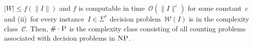 \documentclass{article}
\newcommand{\bigO}[1]{\ensuremath{{\mathcal O}(#1)}}
\newcommand{\CCard}[1]{\|#1\|}
\newcommand{\Card}[1]{\left|#1\right|}
\renewcommand{\P}{\ensuremath{\textsc{P}}\xspace}
\newcommand{\NP}{\ensuremath{\textsc{NP}}\xspace}
\newcommand{\WWW}{\ensuremath{\mathcal{W}}}%
\newcommand{\mtext}[1]{\ensuremath{\mathcal{#1}}}
\newcommand{\cnt}[0]{\ensuremath{\#}}
\newcommand{\cntc}[0]{\ensuremath{\cnt\cdot}}
\begin{document}
$\Card{W} \leq f(\CCard{I})$ and $f$ is computable in
time~$\bigO{\CCard{I}^c}$ for some constant~$c$ and (ii)~for every
instance~$I \in \Sigma^*$ decision problem~$\WWW(I)$ is in the complexity class~$\mtext{C}$.
Then, $\cntc\P$ is the complexity class consisting of all counting
problems associated with decision problems in \NP.
%
%
\end{document}
